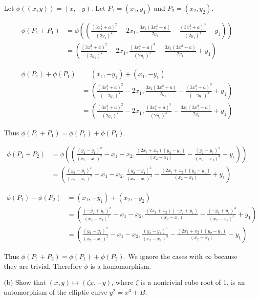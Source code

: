 \documentclass{article}
\begin{document}
Let $\phi((x,y)) = (x,-y)$. Let $P_1 = (x_1,y_1)$ and $P_2 = (x_2,y_2)$.

\begin{align*}
\phi(P_1+P_1) &=
\phi \left(
	\left(
		\frac{(3x_1^2+a)^2}{(2y_1)^2}-2x_1,
		\frac{3x_1(3x_1^2+a)}{2y_1}-\frac{(3x_1^2+a)^3}{(2y_1)^3}-y_1
	\right)
\right) \\
&= \left(
	\frac{(3x_1^2+a)^2}{(2y_1)^2}-2x_1,
	\frac{(3x_1^2+a)^3}{(2y_1)^3} - \frac{3x_1(3x_1^2+a)}{2y_1} + y_1
\right)
\end{align*}

\begin{align*}
\phi(P_1)+\phi(P_1) &= (x_1,-y_1) + (x_1,-y_1) \\
&= \left(
	\frac{(3x_1^2+a)^2}{(-2y_1)^2}-2x_1,
	\frac{3x_1(3x_1^2+a)}{-2y_1}-\frac{(3x_1^2+a)^3}{(-2y_1)^3}+y_1
\right) \\
&= \left(
	\frac{(3x_1^2+a)^2}{(2y_1)^2}-2x_1,
	\frac{(3x_1^2+a)^3}{(2y_1)^3} - \frac{3x_1(3x_1^2+a)}{2y_1} + y_1
\right)
\end{align*}

Thus $\phi(P_1 + P_1) = \phi(P_1) + \phi(P_1)$.

\begin{align*}
\phi(P_1+P_2) &= 
\phi \left(
	\left(
		\frac{(y_2-y_1)^2}{(x_2-x_1)^2}-x_1-x_2,
		\frac{(2x_1+x_2)(y_2-y_1)}{(x_2-x_1)}-\frac{(y_2-y_1)^3}{(x_2-x_1)^3}-y_1
	\right)
\right) \\
&= \left(
	\frac{(y_2-y_1)^2}{(x_2-x_1)^2}-x_1-x_2,
	\frac{(y_2-y_1)^3}{(x_2-x_1)^3} - \frac{(2x_1+x_2)(y_2-y_1)}{(x_2-x_1)} + y_1
\right)
\end{align*}

\begin{align*}
\phi(P_1) + \phi(P_2) &= (x_1, -y_1) + (x_2, -y_2) \\
&=
\left(
	\frac{(-y_2+y_1)^2}{(x_2-x_1)^2}-x_1-x_2,
	\frac{(2x_1+x_2)(-y_2+y_1)}{(x_2-x_1)}-\frac{(-y_2+y_1)^3}{(x_2-x_1)^3}+y_1
\right)
\\
&= \left(
	\frac{(y_2-y_1)^2}{(x_2-x_1)^2}-x_1-x_2,
	\frac{(y_2-y_1)^3}{(x_2-x_1)^3} - \frac{(2x_1+x_2)(y_2-y_1)}{(x_2-x_1)} - y_1
\right)
\end{align*}

Thus $\phi(P_1 + P_2) = \phi(P_1) + \phi(P_2)$. We ignore the cases with $\infty$ because they are trivial. Therefore $\phi$ is a homomorphism.

(b) Show that $(x,y) \mapsto (\zeta x, -y)$, where $\zeta$ is a nontrivial cube root of 1, is an automorphism of the elliptic curve $y^2 = x^3 + B$.
\end{document}
